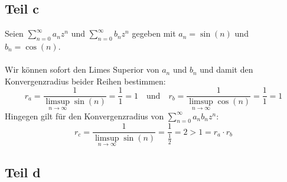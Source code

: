 \documentclass[a4paper,german,12pt,smallheadings]{scrartcl}
\begin{document}
\subsection*{Teil c}

Seien $\sum\limits_{n=0}^{\infty} a_nz^n$ und $\sum\limits_{n=0}^{\infty} b_n z^n$ gegeben mit $a_n=\sin(n)$ und $b_n=\cos(n)$.\\
\\
Wir können sofort den Limes Superior von $a_n$ und $b_n$ und damit den Konvergenzradius beider Reihen bestimmen:
\begin{equation*}
r_a=\frac{1}{\limsup\limits_{n \to \infty} \sin(n)}=\frac{1}{1}=1 \quad \text{und} \quad r_b=\frac{1}{\limsup\limits_{n \to \infty} \cos(n)}=\frac{1}{1}=1
\end{equation*}
Hingegen gilt für den Konvergenzradius von $\sum\limits_{n=0}^{\infty} a_n b_n z^n$:
\begin{equation*}
r_c=\frac{1}{\limsup\limits_{n \to \infty} \sin(n)}=\frac{1}{\frac{1}{2}}=2>1=r_a \cdot r_b
\end{equation*}

\subsection*{Teil d}
\end{document}
